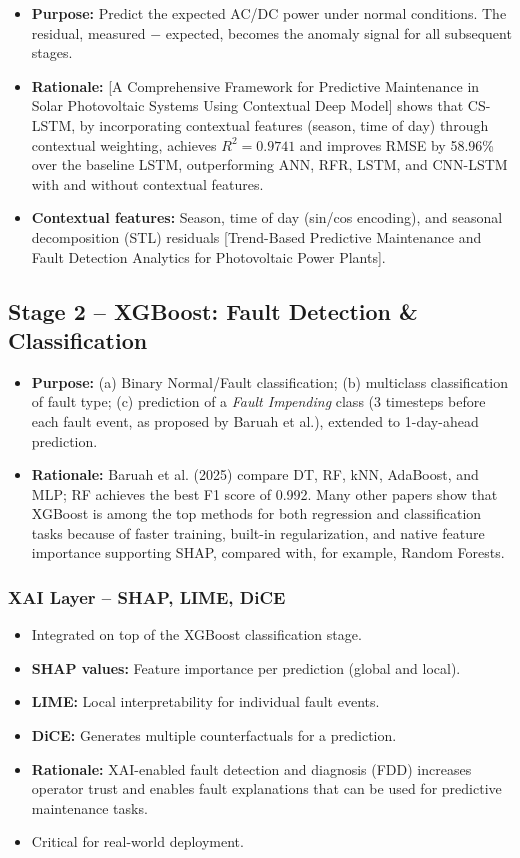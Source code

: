 \documentclass[11pt,a4paper]{article}
\begin{document}
\begin{itemize}
    \item \textbf{Purpose:} Predict the expected AC/DC power under normal conditions. The residual, measured $-$ expected, becomes the anomaly signal for all subsequent stages.
    \item \textbf{Rationale:} [A Comprehensive Framework for Predictive Maintenance in Solar Photovoltaic Systems Using Contextual Deep Model] shows that CS-LSTM, by incorporating contextual features (season, time of day) through contextual weighting, achieves $R^2 = 0.9741$ and improves RMSE by 58.96\% over the baseline LSTM, outperforming ANN, RFR, LSTM, and CNN-LSTM with and without contextual features.
    \item \textbf{Contextual features:} Season, time of day (sin/cos encoding), and seasonal decomposition (STL) residuals [Trend-Based Predictive Maintenance and Fault Detection Analytics for Photovoltaic Power Plants].
\end{itemize}

\subsection*{Stage 2 -- XGBoost: Fault Detection \& Classification}
\begin{itemize}
    \item \textbf{Purpose:} (a) Binary Normal/Fault classification; (b) multiclass classification of fault type; (c) prediction of a \emph{Fault Impending} class (3 timesteps before each fault event, as proposed by Baruah et al.), extended to 1-day-ahead prediction.
    \item \textbf{Rationale:} Baruah et al. (2025) compare DT, RF, kNN, AdaBoost, and MLP; RF achieves the best F1 score of 0.992. Many other papers show that XGBoost is among the top methods for both regression and classification tasks because of faster training, built-in regularization, and native feature importance supporting SHAP, compared with, for example, Random Forests.
\end{itemize}

\subsubsection*{XAI Layer -- SHAP, LIME, DiCE}
\begin{itemize}
    \item Integrated on top of the XGBoost classification stage.
    \item \textbf{SHAP values:} Feature importance per prediction (global and local).
    \item \textbf{LIME:} Local interpretability for individual fault events.
    \item \textbf{DiCE:} Generates multiple counterfactuals for a prediction.
    \item \textbf{Rationale:} XAI-enabled fault detection and diagnosis (FDD) increases operator trust and enables fault explanations that can be used for predictive maintenance tasks.
    \item Critical for real-world deployment.
\end{itemize}
\end{document}
